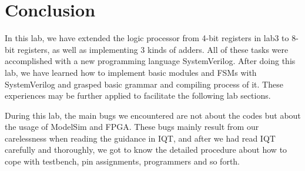 \documentclass[11pt]{article}
\begin{document}
\section{Conclusion}
In this lab, we have extended the logic processor from 4-bit registers in lab3 to 8-bit registers, as well as implementing 3 kinds of adders. All of these tasks were accomplished with a new programming language SystemVerilog. After doing this lab, we have learned how to implement basic modules and FSMs with SystemVerilog and grasped basic grammar and compiling process of it. These experiences may be further applied to facilitate the following lab sections.

During this lab, the main bugs we encountered are not about the codes but about the usage of ModelSim and FPGA. These bugs mainly result from our carelessness when reading the guidance in IQT, and after we had read IQT carefully and thoroughly, we got to know the detailed procedure about how to cope with testbench, pin assignments, programmers and so forth. 

\end{document}
